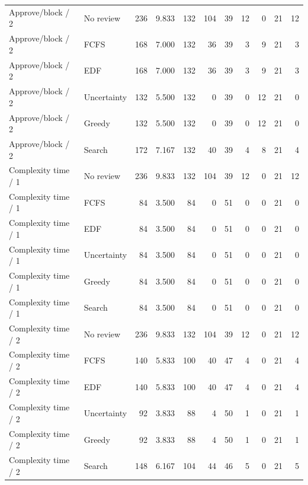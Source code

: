\begin{table}[t]
\begin{tabular}{llrrrrrrrrr}
Approve/block / 2 & No review & 236 & 9.833 & 132 & 104 & 39 & 12 & 0 & 21 & 12 \\
Approve/block / 2 & FCFS & 168 & 7.000 & 132 & 36 & 39 & 3 & 9 & 21 & 3 \\
Approve/block / 2 & EDF & 168 & 7.000 & 132 & 36 & 39 & 3 & 9 & 21 & 3 \\
Approve/block / 2 & Uncertainty & 132 & 5.500 & 132 & 0 & 39 & 0 & 12 & 21 & 0 \\
Approve/block / 2 & Greedy & 132 & 5.500 & 132 & 0 & 39 & 0 & 12 & 21 & 0 \\
Approve/block / 2 & Search & 172 & 7.167 & 132 & 40 & 39 & 4 & 8 & 21 & 4 \\
Complexity time / 1 & No review & 236 & 9.833 & 132 & 104 & 39 & 12 & 0 & 21 & 12 \\
Complexity time / 1 & FCFS & 84 & 3.500 & 84 & 0 & 51 & 0 & 0 & 21 & 0 \\
Complexity time / 1 & EDF & 84 & 3.500 & 84 & 0 & 51 & 0 & 0 & 21 & 0 \\
Complexity time / 1 & Uncertainty & 84 & 3.500 & 84 & 0 & 51 & 0 & 0 & 21 & 0 \\
Complexity time / 1 & Greedy & 84 & 3.500 & 84 & 0 & 51 & 0 & 0 & 21 & 0 \\
Complexity time / 1 & Search & 84 & 3.500 & 84 & 0 & 51 & 0 & 0 & 21 & 0 \\
Complexity time / 2 & No review & 236 & 9.833 & 132 & 104 & 39 & 12 & 0 & 21 & 12 \\
Complexity time / 2 & FCFS & 140 & 5.833 & 100 & 40 & 47 & 4 & 0 & 21 & 4 \\
Complexity time / 2 & EDF & 140 & 5.833 & 100 & 40 & 47 & 4 & 0 & 21 & 4 \\
Complexity time / 2 & Uncertainty & 92 & 3.833 & 88 & 4 & 50 & 1 & 0 & 21 & 1 \\
Complexity time / 2 & Greedy & 92 & 3.833 & 88 & 4 & 50 & 1 & 0 & 21 & 1 \\
Complexity time / 2 & Search & 148 & 6.167 & 104 & 44 & 46 & 5 & 0 & 21 & 5 \\
\bottomrule
\end{tabular}
\end{table}

